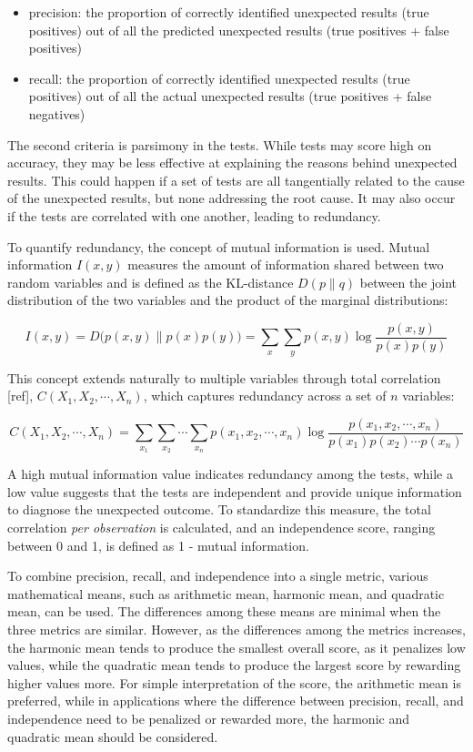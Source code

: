 \documentclass[
  12pt,
]{interact}
\providecommand{\tightlist}{%
  \setlength{\itemsep}{0pt}\setlength{\parskip}{0pt}}\usepackage{longtable,booktabs,array}
\begin{document}
\begin{itemize}
\tightlist
\item
  precision: the proportion of correctly identified unexpected results
  (true positives) out of all the predicted unexpected results (true
  positives + false positives)
\item
  recall: the proportion of correctly identified unexpected results
  (true positives) out of all the actual unexpected results (true
  positives + false negatives)
\end{itemize}

The second criteria is parsimony in the tests. While tests may score
high on accuracy, they may be less effective at explaining the reasons
behind unexpected results. This could happen if a set of tests are all
tangentially related to the cause of the unexpected results, but none
addressing the root cause. It may also occur if the tests are correlated
with one another, leading to redundancy.

To quantify redundancy, the concept of mutual information is used.
Mutual information \(I(x, y)\) measures the amount of information shared
between two random variables and is defined as the KL-distance
\(D(p \parallel q)\) between the joint distribution of the two variables
and the product of the marginal distributions:

\[I(x,y) = D\big(p(x,y) \parallel p(x)p(y)\big) = \sum_x \sum_y p(x,y) \log \frac{p(x,y)}{p(x)p(y)}\]

This concept extends naturally to multiple variables through total
correlation {[}ref{]}, \(C(X_1, X_2, \cdots, X_n)\), which captures
redundancy across a set of \(n\) variables:

\[C(X_1, X_2, \cdots, X_n) = \sum_{x_1} \sum_{x_2} \cdots \sum_{x_n} p(x_1, x_2, \cdots, x_n) \log \frac{p(x_1, x_2, \cdots, x_n)}{p(x_1)p(x_2) \cdots p(x_n)}\]

A high mutual information value indicates redundancy among the tests,
while a low value suggests that the tests are independent and provide
unique information to diagnose the unexpected outcome. To standardize
this measure, the total correlation \emph{per observation} is
calculated, and an independence score, ranging between 0 and 1, is
defined as 1 - mutual information.

To combine precision, recall, and independence into a single metric,
various mathematical means, such as arithmetic mean, harmonic mean, and
quadratic mean, can be used. The differences among these means are
minimal when the three metrics are similar. However, as the differences
among the metrics increases, the harmonic mean tends to produce the
smallest overall score, as it penalizes low values, while the quadratic
mean tends to produce the largest score by rewarding higher values more.
For simple interpretation of the score, the arithmetic mean is
preferred, while in applications where the difference between precision,
recall, and independence need to be penalized or rewarded more, the
harmonic and quadratic mean should be considered.
\end{document}
